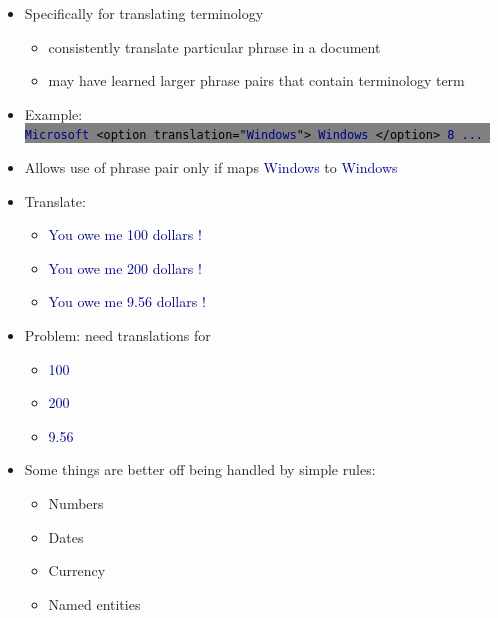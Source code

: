 \documentclass[landscape]{uedslides2C}
\newcommand{\example}[1]{\textcolor{darkblue}{\rm #1}}
\newcommand{\littlecode}[1]{\colorbox{gray}{\textcolor{black}{\small \tt #1}}}
\begin{document}

\vspace{1cm}
\begin{itemize}
\item Specifically for translating terminology
\begin{itemize} 
  \item consistently translate particular phrase in a document
  \item may have learned larger phrase pairs that contain terminology term
\end{itemize} 

\item Example: \\[4mm]
\littlecode{\example{Microsoft} <option translation="\example{Windows}"> \example{Windows}
  </option> \example{8 ...} }

\item Allows use of phrase pair only if maps \example{Windows} to  \example{Windows}
\end{itemize}


\begin{itemize} \itemsep -2mm
\item Translate:
\begin{itemize} \vspace{-2mm}
  \item \example{You owe me 100 dollars !}
  \item \example{You owe me 200 dollars !}
  \item \example{You owe me 9.56 dollars !}
\end{itemize}
\item Problem: need translations for
\begin{itemize} \vspace{-2mm}
  \item \example{100}
  \item \example{200}
  \item \example{9.56}
\end{itemize}
\item Some things are better off being handled by simple rules:
\begin{itemize} \vspace{-2mm}
  \item Numbers
  \item Dates
  \item Currency
  \item Named entities
\end{itemize}
\end{itemize}
\end{document}
